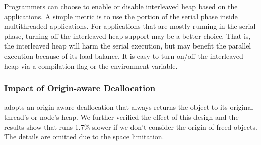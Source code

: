 Programmers can choose to enable or disable interleaved heap based on the applications. A simple metric is to use the portion of the serial phase inside multithreaded applications. For applications that are mostly running in the serial phase, turning off the interleaved heap support may be a better choice. That is, the interleaved heap will harm the serial execution, but may benefit the parallel execution because of its load balance. It is easy to turn on/off the interleaved heap via a compilation flag or the environment variable.  

\subsubsection{Impact of Origin-aware Deallocation}

\NM{} adopts an origin-aware deallocation that always returns the object to its original thread's or node's heap. We further verified the effect of this design and the results show that \NM{} runs 1.7\% slower if we don't consider the origin of freed objects. The details are omitted due to the space limitation. 










